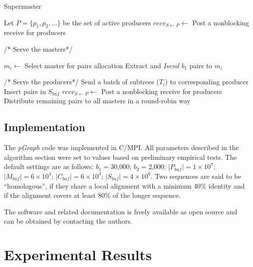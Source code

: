 \documentclass[10pt,journal,letterpaper,compsoc]{IEEEtran}
\begin{document}
\begin{algorithm}
\caption{Supermaster}
\label{sp}
\begin{algorithmic}[1]
	\STATE Let $P=\{p_1, p_2, ...\}$ be the set of active producers
	\STATE $recv_{S\leftarrow P}\leftarrow$ Post a nonblocking receive for producers
			
	    
	    \STATE /* Serve the masters*/        
	    	
	    	\STATE $m_i\leftarrow$ Select master for pairs allocation
		    \STATE Extract and {\it Isend} $b_1$ pairs to $m_i$ 
		    	
		    \ENDIF
		    \STATE /* Serve the producers*/        
		             \STATE Send a batch of subtrees ($T_i$) to corresponding producer
			        \STATE Insert pairs in $S_{buf}$
		        \ENDIF
		        \STATE $recv_{S\leftarrow P}\leftarrow$ Post a nonblocking receive for producers
		    \ENDIF    
    \ENDWHILE
	\STATE Distribute remaining pairs to all masters in a round-robin way
\end{algorithmic}
\end{algorithm}


\subsection{Implementation}
The {\it pGraph} code was implemented in C/MPI. All parameters described in the algorithm section were set to values based on preliminary empirical tests.  The default settings are as follows: $b_1=$30,000; $b_2=$2,000; $|P_{buf}|=1\times 10^7$; $|M_{buf}|=6\times 10^4$; $|C_{buf}|=6\times 10^3$; $|S_{buf}|=4\times 10^6$. 
Two sequences are said to be ``homologous'', if they share a local alignment with a minimum 40\% identity and if the alignment covers at least 80\% of the longer sequence. 

The software and related documentation is freely available as open source and can be obtained by contacting the authors.

\section{Experimental Results}
\label{secResults}
\end{document}
